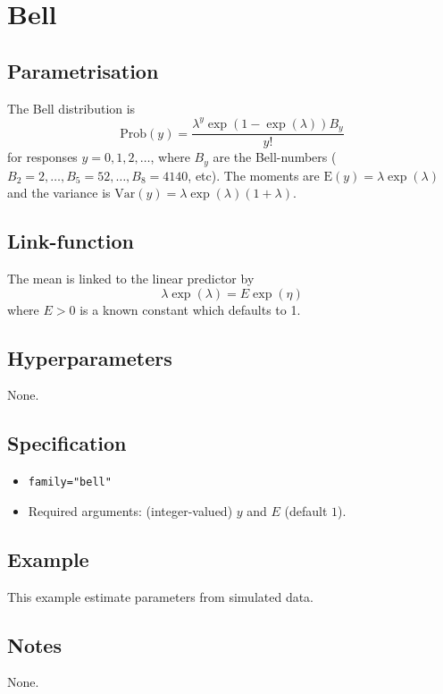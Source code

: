 \documentclass[a4paper,11pt]{article}
\begin{document}
\section*{Bell}

\subsection*{Parametrisation}

The Bell distribution is
\begin{displaymath}
    \text{Prob}(y) = \frac{\lambda^{y} \exp(1-\exp(\lambda)) B_y}{y!}
\end{displaymath}
for responses $y=0, 1, 2, \ldots$, where $B_y$ are the Bell-numbers
($B_2=2, \ldots,  B_5=52, \ldots, B_8=4140$, etc). The moments are
$\text{E}(y)=\lambda\exp(\lambda)$ and the variance is
$\text{Var}(y)=\lambda\exp(\lambda)(1+\lambda)$.



\subsection*{Link-function}

The mean is linked to the linear predictor by
\begin{displaymath}
    \lambda\exp(\lambda) = E \exp(\eta)
\end{displaymath}
where $E>0$ is a known constant which defaults to 1.

\subsection*{Hyperparameters}
None.

\subsection*{Specification}

\begin{itemize}
\item \texttt{family="bell"}
\item Required arguments: (integer-valued) $y$ and $E$ (default $1$).
\end{itemize}


\subsection*{Example}

This example estimate parameters from simulated data.
{\small}

\subsection*{Notes}

None.
\end{document}
